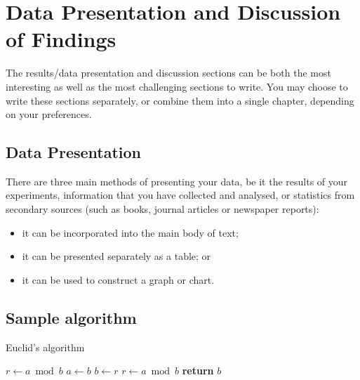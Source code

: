 \chapter{Data Presentation and Discussion of Findings}
The results/data presentation and discussion sections can be both the most interesting as well as the most challenging sections to write. You may choose to write these sections separately, or combine them into a single chapter, depending on your preferences.

\section{Data Presentation}
There are three main methods of presenting your data, be it the results of your experiments, information that you have collected and analysed, or statistics from secondary sources (such as books, journal articles or newspaper reports):

\begin{itemize}
    \item it can be incorporated into the main body of text;
    \item it can be presented separately as a table; or
    \item it can be used to construct a graph or chart.
\end{itemize}

\section{Sample algorithm}
\lipsum[2]
\begin{algorithm}
\caption{Euclid's algorithm}\label{euclid}
\begin{algorithmic}[1]
   \State $r\gets a\bmod b$
      \State $a\gets b$
      \State $b\gets r$
      \State $r\gets a\bmod b$
   \EndWhile\label{euclidendwhile}
   \State \textbf{return} $b$
\EndProcedure
\end{algorithmic}
\end{algorithm}
